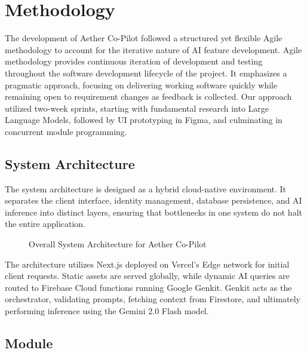 \chapter{Methodology}

The development of Aether Co-Pilot followed a structured yet flexible Agile methodology to account for the iterative nature of AI feature development. Agile methodology provides continuous iteration of development and testing throughout the software development lifecycle of the project. It emphasizes a pragmatic approach, focusing on delivering working software quickly while remaining open to requirement changes as feedback is collected. Our approach utilized two-week sprints, starting with fundamental research into Large Language Models, followed by UI prototyping in Figma, and culminating in concurrent module programming.

\section{System Architecture}

The system architecture is designed as a hybrid cloud-native environment. It separates the client interface, identity management, database persistence, and AI inference into distinct layers, ensuring that bottlenecks in one system do not halt the entire application.

\begin{figure}[!ht]
\centering
\caption{Overall System Architecture for Aether Co-Pilot}
\label{fig:sys_arch}
\end{figure}

The architecture utilizes Next.js deployed on Vercel's Edge network for initial client requests. Static assets are served globally, while dynamic AI queries are routed to Firebase Cloud functions running Google Genkit. Genkit acts as the orchestrator, validating prompts, fetching context from Firestore, and ultimately performing inference using the Gemini 2.0 Flash model.

\section{Module}

